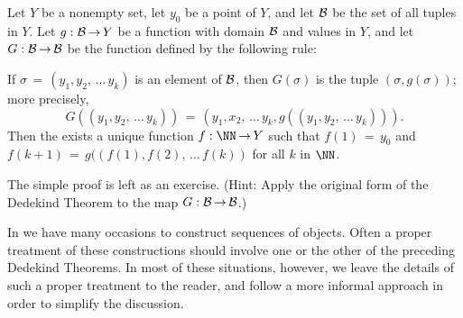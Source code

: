        Let $Y$ be a nonempty set, let $y_{0}$ be a point of $Y$, and let ${\cal B}$ be the set of all tuples in $Y$.
    Let $g:{\cal B} \,{\rightarrow}\, Y$ be a function with domain ${\cal B}$ and values in $Y$,
    and let $G:{\cal B} \,{\rightarrow}\, {\cal B}$ be the function defined by the following rule:

        If ${\sigma} \,=\, (y_{1},y_{2},\,{\ldots}\,y_{k})$ is an element of ${\cal B}$, then $G({\sigma})$ is the tuple $({\sigma},g({\sigma}))$;
    more precisely,
        \begin{displaymath}
        G((y_{1},y_{2},\,{\ldots}\,y_{k})) \,=\, (y_{1},x_{2},\,{\ldots}\,y_{k}, g((y_{1},y_{2},\,{\ldots}\,y_{k}))).
        \end{displaymath}
    Then the exists a unique function $f:{\NN} \,{\rightarrow}\, Y$ such that $f(1) \,=\, y_{0}$ and $f(k+1) \,=\, g((f(1),f(2),\,{\ldots}\,f(k))$ for all $k$ in ${\NN}$.

\V

        The simple proof is left as an exercise. (Hint: Apply the original form of the Dedekind Theorem to the map $G:{\cal B} \,{\rightarrow}\, {\cal B}$.)

\V
\V



        In {\TheseNotes} we have many occasions to construct sequences of objects.
    Often a proper treatment of these constructions should involve one or the other of the preceding Dedekind Theorems.
    In most of these situations, however, we leave the details of such a proper treatment to the reader,
    and follow a more informal approach in order to simplify the discussion.





